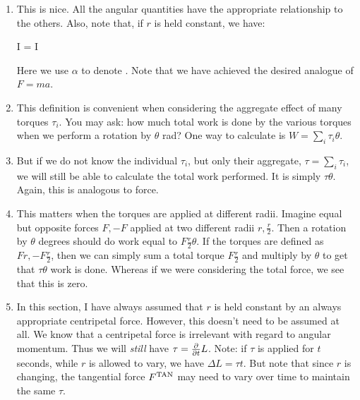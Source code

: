 \begin{enumerate}
  \item This is nice. All the angular quantities have the appropriate
  relationship to the others. Also, note that, if $r$ is held constant,
  we have:

  \begin{nedqn}
    \tau
  \eqcol
    I  = I \alpha
  \end{nedqn}

  \noindent
  Here we use $\alpha$ to denote . Note
  that we have achieved the desired analogue of $F=ma$.

  \item This definition is convenient when considering the aggregate
  effect of many torques $\tau_i$. You may ask: how much total work is
  done by the various torques when we perform a rotation by $\theta$
  rad? One way to calculate is $W = \sum_i \tau_i \theta$.

  \item But if we do not know the individual $\tau_i$, but only their
  aggregate, $\tau = \sum_i \tau_i$, we will still be able to calculate
  the total work performed. It is simply $\tau \theta$. Again, this is
  analogous to force.

  \item This matters when the torques are applied at different radii.
  Imagine equal but opposite forces $F, -F$ applied at two different
  radii $r, \frac{r}{2}$. Then a rotation by $\theta$ degrees should do
  work equal to $F \frac{r}{2} \theta$. If the torques are defined as
  $Fr, -F\frac{r}{2}$, then we can simply sum a total torque
  $F\frac{r}{2}$ and multiply by $\theta$ to get that $\tau \theta$ work
  is done. Whereas if we were considering the total force, we see that
  this is zero.

  \item In this section, I have always assumed that $r$ is held constant
  by an always appropriate centripetal force. However, this doesn't need
  to be assumed at all. We know that a centripetal force is irrelevant
  with regard to angular momentum. Thus we will \emph{still} have $\tau
  = \frac{\partial }{\partial t} L$. Note: if $\tau$ is applied for $t$ seconds, while
  $r$ is allowed to vary, we have $\Delta L = \tau t$. But note that
  since $r$ is changing, the tangential force $F^{\text{TAN}}$ may need to vary
  over time to maintain the same $\tau$.
\end{enumerate}
